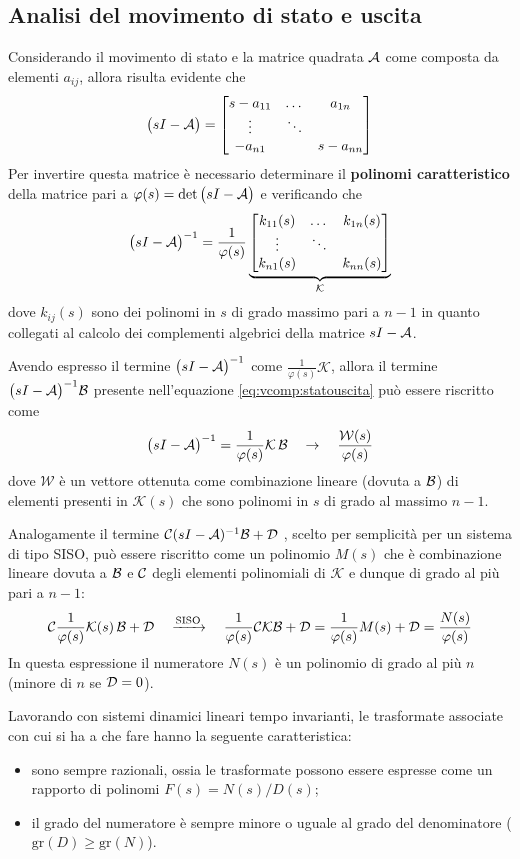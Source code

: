 	\subsection{Analisi del movimento di stato e uscita}
		Considerando il movimento di stato e la matrice quadrata $\mathcal A$ come composta da elementi $a_{ij}$, allora risulta evidente che
		\[ \big(sI- \mathcal A\big) = \begin{bmatrix}
			s - a_{11}  & \dots & a_{1n} \\
			\vdots & \ddots \\
			-a_{n1} & &s-a_{nn} 
		\end{bmatrix} \]
		Per invertire questa matrice è necessario determinare il \textbf{polinomi caratteristico} della matrice pari a $\varphi(s) = \det\big(sI-\mathcal A\big)$ e verificando che
		\[ \big(sI- \mathcal A\big)^{-1} = \frac 1 {\varphi(s)} \underbrace{\begin{bmatrix}
			k_{11}(s) & \dots & k_{1n}(s) \\ \vdots & \ddots & \\ k_{n1}(s) & &k_{nn}(s)
		\end{bmatrix}}_{\mathcal K}  \]
		dove $k_{ij}(s)$ sono dei polinomi in $s$ di grado massimo pari a $n-1$ in quanto collegati al calcolo dei complementi algebrici della matrice $sI-\mathcal A$.
		
		Avendo espresso il termine $\big(sI- \mathcal A\big)^{-1}$ come $\frac{1}{\varphi(s)} \mathcal K$, allora il termine  $\big(sI-\mathcal A\big)^{-1}\mathcal B$ presente nell'equazione \ref{eq:vcomp:statouscita} può essere riscritto come
		\[ \big(sI- \mathcal A\big)^{-1} = \frac 1 {\varphi(s)} \mathcal K \, \mathcal B \quad \rightarrow \quad \frac{\mathcal W(s)}{\varphi(s)} \]
		dove $\mathcal W$ è un vettore ottenuta come combinazione lineare (dovuta a $\mathcal B$) di elementi presenti in $\mathcal K(s)$ che sono polinomi in $s$ di grado al massimo $n-1$.
		
		Analogamente il termine $\mathcal C (sI-\mathcal A)^{-1}\mathcal B + \mathcal D$ , scelto per semplicità per un sistema di tipo SISO, può essere riscritto come un polinomio $M(s)$ che è combinazione lineare dovuta a $\mathcal B$ e $\mathcal C$ degli elementi polinomiali di $\mathcal K$ e dunque di grado al più pari a $n-1$:
		\[ \mathcal C \frac 1 {\varphi(s)} \mathcal K(s) \, \mathcal B + \mathcal D \quad \xrightarrow{\textrm{SISO}} \quad \frac{1}{\varphi(s)} {\mathcal C \mathcal K \mathcal B} + \mathcal D = \frac{1}{\varphi(s)} M(s) + \mathcal D = \frac{N(s)}{\varphi(s)}\] 
		In questa espressione il numeratore $N(s)$ è un polinomio di grado al più $n$ (minore di $n$ se $\mathcal D = 0$).
			
		\begin{concetto}
			Lavorando con sistemi dinamici lineari tempo invarianti, le trasformate associate con cui si ha a che fare hanno la seguente caratteristica:
			\begin{itemize}
				\item sono sempre razionali, ossia le trasformate possono essere espresse come un rapporto di polinomi $F(s)=N(s)/D(s)$;
				\item il grado del numeratore è sempre minore o uguale al grado del denominatore ($\textrm{gr}(D) \geq \textrm{gr}(N)$).
			\end{itemize}
		\end{concetto}
			
